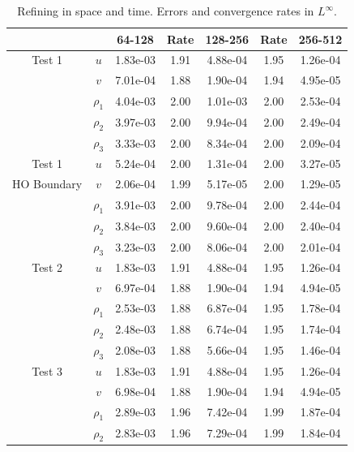 \documentclass[final]{siamltex}
\begin{document}
\begin{table}[h]
\begin{center}
\caption{Refining in space and time.  Errors and convergence rates in $L^\infty$.}
\label{tab:Linf}
\begin{tabular}{ccccccc}
& & 64-128 & Rate & 128-256 & Rate & 256-512 \\
\hline
Test 1              & $u$      & 1.83e-03 & 1.91 & 4.88e-04 & 1.95 & 1.26e-04 \\
                    & $v$      & 7.01e-04 & 1.88 & 1.90e-04 & 1.94 & 4.95e-05 \\
                    & $\rho_1$ & 4.04e-03 & 2.00 & 1.01e-03 & 2.00 & 2.53e-04 \\
                    & $\rho_2$ & 3.97e-03 & 2.00 & 9.94e-04 & 2.00 & 2.49e-04 \\
                    & $\rho_3$ & 3.33e-03 & 2.00 & 8.34e-04 & 2.00 & 2.09e-04 \\
\hline
Test 1              & $u$      & 5.24e-04 & 2.00 & 1.31e-04 & 2.00 & 3.27e-05 \\
HO Boundary         & $v$      & 2.06e-04 & 1.99 & 5.17e-05 & 2.00 & 1.29e-05 \\
                    & $\rho_1$ & 3.91e-03 & 2.00 & 9.78e-04 & 2.00 & 2.44e-04 \\
                    & $\rho_2$ & 3.84e-03 & 2.00 & 9.60e-04 & 2.00 & 2.40e-04 \\
                    & $\rho_3$ & 3.23e-03 & 2.00 & 8.06e-04 & 2.00 & 2.01e-04 \\
\hline
Test 2              & $u$      & 1.83e-03 & 1.91 & 4.88e-04 & 1.95 & 1.26e-04 \\
                    & $v$      & 6.97e-04 & 1.88 & 1.90e-04 & 1.94 & 4.94e-05 \\
                    & $\rho_1$ & 2.53e-03 & 1.88 & 6.87e-04 & 1.95 & 1.78e-04 \\
                    & $\rho_2$ & 2.48e-03 & 1.88 & 6.74e-04 & 1.95 & 1.74e-04 \\
                    & $\rho_3$ & 2.08e-03 & 1.88 & 5.66e-04 & 1.95 & 1.46e-04 \\
\hline
Test 3              & $u$      & 1.83e-03 & 1.91 & 4.88e-04 & 1.95 & 1.26e-04 \\
                    & $v$      & 6.98e-04 & 1.88 & 1.90e-04 & 1.94 & 4.94e-05 \\
                    & $\rho_1$ & 2.89e-03 & 1.96 & 7.42e-04 & 1.99 & 1.87e-04 \\
                    & $\rho_2$ & 2.83e-03 & 1.96 & 7.29e-04 & 1.99 & 1.84e-04 \\

\end{tabular}
\end{center}
\end{table}
\end{document}

